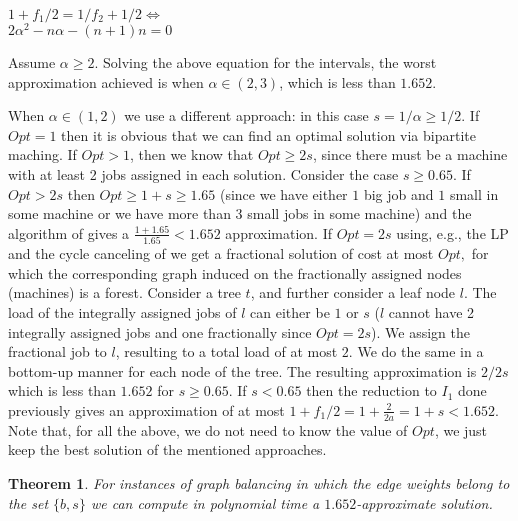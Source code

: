 \documentclass[11pt]{article}\usepackage{amsmath}
\newtheorem{theorem}{Theorem}[section]
\begin{document}
\begin{center}
$1+f_1/2=1/f_2+1/2 \Leftrightarrow$\\
$2\alpha^2-n\alpha-(n+1)n=0$
\end{center}

Assume $\alpha \ge 2$. Solving the above equation for the intervals, the worst approximation achieved is when $\alpha \in (2,3)$, which is less than $1.652$.

When $\alpha \in (1,2)$  we use a different approach: in this case
$s=1/\alpha \ge 1/2$. If $Opt=1$ then it is obvious that we can find
an optimal solution via bipartite maching. If $Opt>1$, then we know
that $Opt \geq 2s$, since there must be a machine with at least 2 jobs
assigned in each solution. Consider the case $s\geq 0.65$. If $Opt > 2s$ then $Opt \geq 1+s \geq 1.65$ (since we have either $1$ big job and $1$ small in some machine or we have more than 3 small jobs in some machine) and the
algorithm of \cite{lenstra} gives a $\frac{1+1.65}{1.65} < 1.652$
approximation. If $Opt=2s$ using, e.g., the LP and the cycle canceling
of \cite{ebenlendr} we get a fractional solution of cost  at most $Opt,$  for which the corresponding graph induced on the fractionally assigned nodes (machines) is a forest. Consider a tree $t$, and further consider a leaf node $l$. The load of the integrally assigned jobs of $l$  can either be $1$ or $s$ ($l$ cannot have 2 integrally assigned jobs and one fractionally since $Opt=2s$). We assign the fractional job to $l$, resulting to a total load of at most $2$. We do the same in a bottom-up manner for each node of the tree. The resulting approximation is $2/2s$ which is less than $1.652$ for $s \geq 0.65$. If $s<0.65$ then the reduction to $I_1$ done previously gives an approximation of at most $1+f_1/2 =1+\frac{2}{2a}=1+s < 1.652$. Note that, for all the above, we do not need  to know the value of $Opt$, we just keep the best solution of the mentioned approaches.

\begin{theorem}
For instances of graph balancing in which the edge weights belong to
the set $\{ b,s \}$ we 
can compute in polynomial time  a $1.652$-approximate solution.
\end{theorem}




\end{document}
